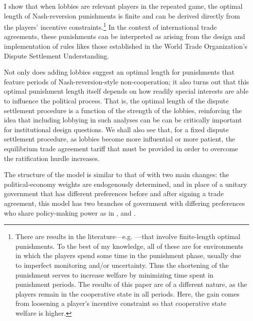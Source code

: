 \documentclass[authoryear, review]{elsarticle}
\begin{document}
I show that when lobbies are relevant players in the repeated game, the optimal length of Nash-reversion punishments is finite and can be derived directly from the players' incentive constraints.\footnote{There are results in the literature---e.g. \citet{greenporter}---that involve finite-length optimal punishments. To the best of my knowledge, all of these are for environments in which the players spend some time in the punishment phase, usually due to imperfect monitoring and/or uncertainty. Thus the shortening of the punishment serves to increase welfare by minimizing time spent in punishment periods. The results of this paper are of a different nature, as the players remain in the cooperative state in all periods. Here, the gain comes from loosening a player's incentive constraint so that cooperative state welfare is higher.} In the context of international trade agreements, these punishments can be interpreted as arising from the design and implementation of rules likes those established in the World Trade Organization's Dispute Settlement Understanding.

Not only does adding lobbies suggest an optimal length for punishments that feature periods of Nash-reversion-style non-cooperation; it also turns out that this optimal punishment length itself depends on how readily special interests are able to influence the political process. That is, the optimal length of the dispute settlement procedure is a function of the strength of the lobbies, reinforcing the idea that including lobbying in such analyses can be can be critically important for institutional design questions. We shall also see that, for a fixed dispute settlement procedure, as lobbies become more influential or more patient, the equilibrium trade agreement tariff that must be provided in order to overcome the ratification hurdle increases. 

The structure of the model is similar to that of \citet{bs2005} with two main changes: the political-economy weights are endogenously determined, and in place of a unitary government that has different preferences before and after signing a trade agreement, this model has two branches of government with differing preferences who share policy-making power as in \citet{mr97}, \citet{song} and \citet{buzard2013b}.
\end{document}
